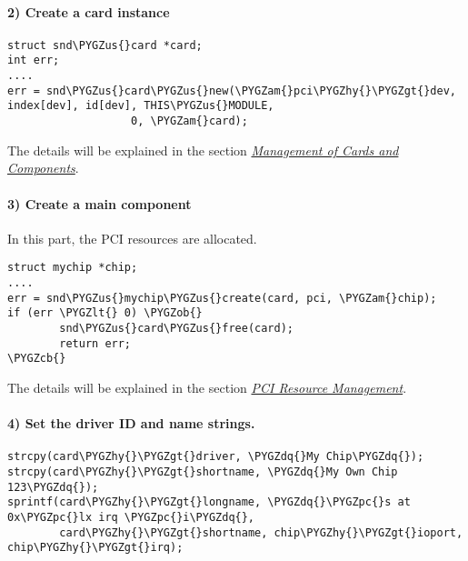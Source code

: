 \documentclass[a4paper,8pt,english]{sphinxmanual}
\def\PYGZus{\char`\_}
\def\PYGZob{\char`\{}
\def\PYGZcb{\char`\}}
\def\PYGZam{\char`\&}
\def\PYGZlt{\char`\<}
\def\PYGZgt{\char`\>}
\def\PYGZpc{\char`\%}
\def\PYGZhy{\char`\-}
\def\PYGZdq{\char`\"}
\begin{document}
\paragraph{2) Create a card instance}
\label{sound/kernel-api/writing-an-alsa-driver:create-a-card-instance}
\begin{Verbatim}[commandchars=\\\{\}]
struct snd\PYGZus{}card *card;
int err;
....
err = snd\PYGZus{}card\PYGZus{}new(\PYGZam{}pci\PYGZhy{}\PYGZgt{}dev, index[dev], id[dev], THIS\PYGZus{}MODULE,
                   0, \PYGZam{}card);
\end{Verbatim}

The details will be explained in the section {\hyperref[sound/kernel\string-api/writing\string-an\string-alsa\string-driver:management\string-of\string-cards\string-and\string-components]{\emph{Management of Cards and
Components}}}.


\paragraph{3) Create a main component}
\label{sound/kernel-api/writing-an-alsa-driver:create-a-main-component}
In this part, the PCI resources are allocated.

\begin{Verbatim}[commandchars=\\\{\}]
struct mychip *chip;
....
err = snd\PYGZus{}mychip\PYGZus{}create(card, pci, \PYGZam{}chip);
if (err \PYGZlt{} 0) \PYGZob{}
        snd\PYGZus{}card\PYGZus{}free(card);
        return err;
\PYGZcb{}
\end{Verbatim}

The details will be explained in the section {\hyperref[sound/kernel\string-api/writing\string-an\string-alsa\string-driver:pci\string-resource\string-management]{\emph{PCI Resource
Management}}}.


\paragraph{4) Set the driver ID and name strings.}
\label{sound/kernel-api/writing-an-alsa-driver:set-the-driver-id-and-name-strings}
\begin{Verbatim}[commandchars=\\\{\}]
strcpy(card\PYGZhy{}\PYGZgt{}driver, \PYGZdq{}My Chip\PYGZdq{});
strcpy(card\PYGZhy{}\PYGZgt{}shortname, \PYGZdq{}My Own Chip 123\PYGZdq{});
sprintf(card\PYGZhy{}\PYGZgt{}longname, \PYGZdq{}\PYGZpc{}s at 0x\PYGZpc{}lx irq \PYGZpc{}i\PYGZdq{},
        card\PYGZhy{}\PYGZgt{}shortname, chip\PYGZhy{}\PYGZgt{}ioport, chip\PYGZhy{}\PYGZgt{}irq);
\end{Verbatim}
\end{document}
